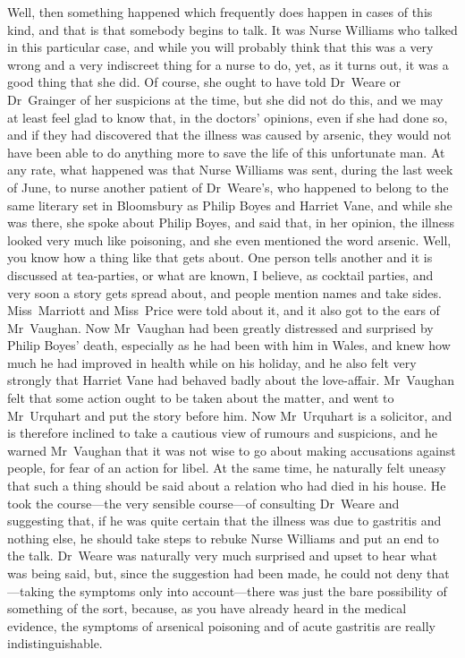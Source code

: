 Well, then something happened which frequently does happen in cases of this kind, and that is that somebody begins to talk. It was Nurse Williams who talked in this particular case, and while you will probably think that this was a very wrong and a very indiscreet thing for a nurse to do, yet, as it turns out, it was a good thing that she did. Of course, she ought to have told Dr~Weare or Dr~Grainger of her suspicions at the time, but she did not do this, and we may at least feel glad to know that, in the doctors' opinions, even if she had done so, and if they had discovered that the illness was caused by arsenic, they would not have been able to do anything more to save the life of this unfortunate man. At any rate, what happened was that Nurse Williams was sent, during the last week of June, to nurse another patient of Dr~Weare's, who happened to belong to the same literary set in Bloomsbury as Philip Boyes and Harriet Vane, and while she was there, she spoke about Philip Boyes, and said that, in her opinion, the illness looked very much like poisoning, and she even mentioned the word arsenic. Well, you know how a thing like that gets about. One person tells another and it is discussed at tea-parties, or what are known, I believe, as cocktail parties, and very soon a story gets spread about, and people mention names and take sides. Miss~Marriott and Miss~Price were told about it, and it also got to the ears of Mr~Vaughan. Now Mr~Vaughan had been greatly distressed and surprised by Philip Boyes' death, especially as he had been with him in Wales, and knew how much he had improved in health while on his holiday, and he also felt very strongly that Harriet Vane had behaved badly about the love-affair. Mr~Vaughan felt that some action ought to be taken about the matter, and went to Mr~Urquhart and put the story before him. Now Mr~Urquhart is a solicitor, and is therefore inclined to take a cautious view of rumours and suspicions, and he warned Mr~Vaughan that it was not wise to go about making accusations against people, for fear of an action for libel. At the same time, he naturally felt uneasy that such a thing should be said about a relation who had died in his house. He took the course—the very sensible course—of consulting Dr~Weare and suggesting that, if he was quite certain that the illness was due to gastritis and nothing else, he should take steps to rebuke Nurse Williams and put an end to the talk. Dr~Weare was naturally very much surprised and upset to hear what was being said, but, since the suggestion had been made, he could not deny that—taking the symptoms only into account—there was just the bare possibility of something of the sort, because, as you have already heard in the medical evidence, the symptoms of arsenical poisoning and of acute gastritis are really indistinguishable.

